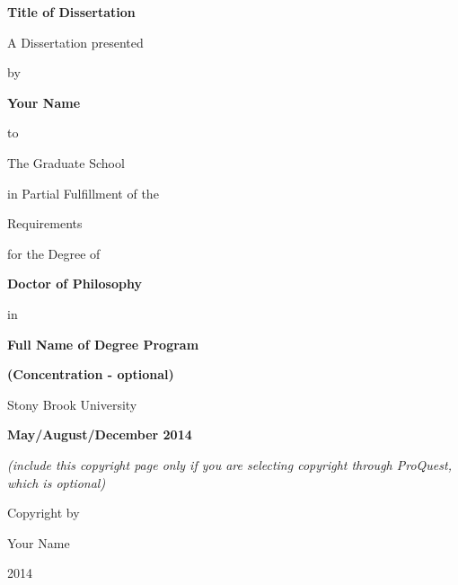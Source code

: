 \vspace*{3\baselineskip}
\centerline{\bf{Title of Dissertation}}
\vspace*{1\baselineskip}
\centerline{A Dissertation presented}
\vspace*{1\baselineskip}
\centerline{by} 
\vspace*{1\baselineskip}
\centerline{\bf{Your Name}}
\vspace*{1\baselineskip}
\centerline{to} 
\vspace*{1\baselineskip}
\centerline{The Graduate School}
\vspace*{1\baselineskip}
\centerline{in Partial Fulfillment of the}
\vspace*{1\baselineskip}
\centerline{Requirements}
\vspace*{1\baselineskip}
\centerline{for the Degree of}
\vspace*{1\baselineskip}
\centerline{\bf{Doctor of Philosophy}}
\vspace*{1\baselineskip}
\centerline{in}
\vspace*{1\baselineskip}
\centerline{\bf{Full Name of Degree Program}}
\vspace*{1\baselineskip}
\centerline{\bf{(Concentration - optional)}}
\vspace*{2\baselineskip}
\centerline{Stony Brook University}
\vspace*{2\baselineskip}
\centerline{\bf{May/August/December 2014}}     

\newpage
{}

\vspace*{32\baselineskip}
\centerline{\it{(include this copyright page only if you are selecting copyright through ProQuest, which is optional)}}
\vspace*{1\baselineskip}
\centerline{Copyright by}
\centerline{Your Name}
\centerline{2014}

\newpage
{}
\setcounter{page}{2}


